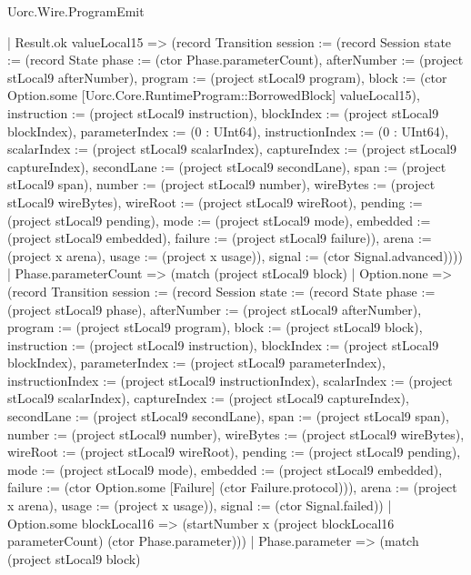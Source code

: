 \begin{lexlean}{Uorc.Wire.ProgramEmit}
\begin{semanticmodule}
{          | Result.ok valueLocal15 => (record Transition {session := (record Session {state := (record State {phase := (ctor Phase.parameterCount), afterNumber := (project stLocal9 afterNumber), program := (project stLocal9 program), block := (ctor Option.some [Uorc.Core.RuntimeProgram::BorrowedBlock] valueLocal15), instruction := (project stLocal9 instruction), blockIndex := (project stLocal9 blockIndex), parameterIndex := (0 : UInt64), instructionIndex := (0 : UInt64), scalarIndex := (project stLocal9 scalarIndex), captureIndex := (project stLocal9 captureIndex), secondLane := (project stLocal9 secondLane), span := (project stLocal9 span), number := (project stLocal9 number), wireBytes := (project stLocal9 wireBytes), wireRoot := (project stLocal9 wireRoot), pending := (project stLocal9 pending), mode := (project stLocal9 mode), embedded := (project stLocal9 embedded), failure := (project stLocal9 failure)}), arena := (project x arena), usage := (project x usage)}), signal := (ctor Signal.advanced)})))
        | Phase.parameterCount => (match (project stLocal9 block)
          | Option.none => (record Transition {session := (record Session {state := (record State {phase := (project stLocal9 phase), afterNumber := (project stLocal9 afterNumber), program := (project stLocal9 program), block := (project stLocal9 block), instruction := (project stLocal9 instruction), blockIndex := (project stLocal9 blockIndex), parameterIndex := (project stLocal9 parameterIndex), instructionIndex := (project stLocal9 instructionIndex), scalarIndex := (project stLocal9 scalarIndex), captureIndex := (project stLocal9 captureIndex), secondLane := (project stLocal9 secondLane), span := (project stLocal9 span), number := (project stLocal9 number), wireBytes := (project stLocal9 wireBytes), wireRoot := (project stLocal9 wireRoot), pending := (project stLocal9 pending), mode := (project stLocal9 mode), embedded := (project stLocal9 embedded), failure := (ctor Option.some [Failure] (ctor Failure.protocol))}), arena := (project x arena), usage := (project x usage)}), signal := (ctor Signal.failed)})
          | Option.some blockLocal16 => (startNumber x (project blockLocal16 parameterCount) (ctor Phase.parameter)))
        | Phase.parameter => (match (project stLocal9 block)
}
\end{semanticmodule}
\end{lexlean}
